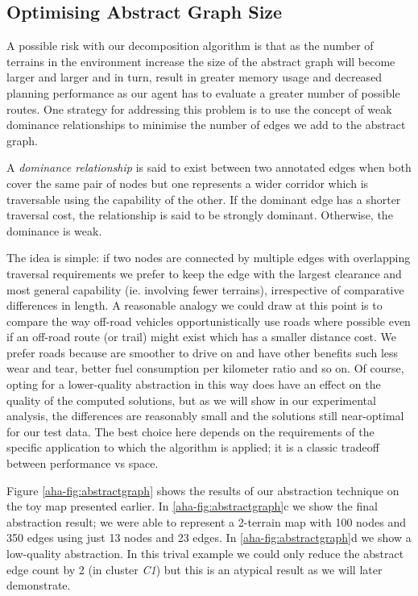 

\subsection{Optimising Abstract Graph Size}
A possible risk with our decomposition algorithm is that as the number of terrains in the environment increase the size of the abstract graph will become larger and larger and in turn, result in greater memory usage and decreased planning performance as our agent has to evaluate a greater number of possible routes.
One strategy for addressing this problem is to use the concept of weak dominance relationships to minimise the number of edges we add to the abstract graph. 

\begin{definition}
A \emph{dominance relationship} is said to exist between two annotated edges when both cover the same pair of nodes but one represents a wider corridor which is traversable using the capability of the other. If the dominant edge has a shorter traversal cost, the relationship is said to be strongly dominant. Otherwise, the dominance is weak.
\end{definition}

The idea is simple: if two nodes are connected by multiple edges with overlapping traversal requirements we prefer to keep the edge with the largest clearance and most general capability (ie. involving fewer terrains), irrespective of comparative differences in length. A reasonable analogy we could draw at this point is to compare the way off-road vehicles opportunistically use roads where possible even if an off-road route (or trail) might exist which has a smaller distance cost. We prefer roads because are smoother to drive on and have other benefits such less wear and tear, better fuel consumption per kilometer ratio and so on. Of course, opting for a lower-quality abstraction in this way does have an effect on the quality of the computed solutions, but as we will show in our experimental analysis, the differences are reasonably small and the solutions still near-optimal for our test data. The best choice here depends on the requirements of the specific application to which the algorithm is applied; it is a classic tradeoff between performance vs space.

Figure \ref{aha-fig:abstractgraph} shows the results of our abstraction technique on the toy map presented earlier. In \ref{aha-fig:abstractgraph}c we show the final abstraction result; we were able to represent a 2-terrain map with 100 nodes and 350 edges using just 13 nodes and  23 edges. In \ref{aha-fig:abstractgraph}d we show a low-quality abstraction. In this trival example we could only reduce the abstract edge count by 2 (in cluster \emph{C1}) but this is an atypical result as we will later demonstrate.

